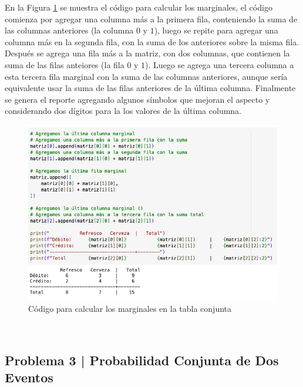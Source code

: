 \documentclass{article}
\begin{document}
\break
\noindent
En la Figura \ref{fig:s202-2} se muestra el código para calcular los marginales, el código comienza por agregar una columna más a la primera fila, conteniendo la suma de las columnas anteriores (la columna $0$ y $1$), luego se repite para agregar una columna más en la segunda fila, con la suma de los anteriores sobre la misma fila. Después se agrega una fila más a la matriz, con dos columnas, que contienen la suma de las filas anteiores (la fila $0$ y $1$). Luego se agrega una tercera columna a esta tercera fila marginal con la suma de las columnas anteriores, aunque sería equivalente usar la suma de las filas anteriores de la última columna. Finalmente se genera el reporte agregando algunos símbolos que mejoran el aspecto y considerando dos dígitos para la los valores de la última columna.
\begin{figure}[!ht]
    \centering
    \begin{minipage}{\textwidth}
        \centering
        \includegraphics[width=\textwidth]{figures/s202-2.png}
    \end{minipage}
    \captionsetup{width=0.9\textwidth}
    \caption{Código para calcular los marginales en la tabla conjunta}
    \label{fig:s202-2}
\end{figure}
\\

\clearpage

\subsection*{Problema 3 | Probabilidad Conjunta de Dos Eventos}
\end{document}
